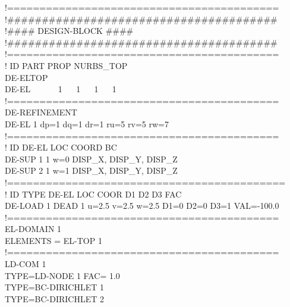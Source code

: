 !==========================================\\
!\#\#\#\#\#\#\#\#\#\#\#\#\#\#\#\#\#\#\#\#\#\#\#\#\#\#\#\#\#\#\#\#\#\#\#\#\#\#\#\\
!\#\#\#\# \hspace*{1.55cm} DESIGN-BLOCK \hspace*{1.55cm} \#\#\#\#\\
!\#\#\#\#\#\#\#\#\#\#\#\#\#\#\#\#\#\#\#\#\#\#\#\#\#\#\#\#\#\#\#\#\#\#\#\#\#\#\#\\
!==========================================\\
!     \hspace*{3cm}         ID  PART  PROP   NURBS\_TOP\\
DE-ELTOP\\
\hspace*{0.5cm} DE-EL    ~~~~~~1 ~~ 1 ~~  1    ~~  1\\
!==========================================\\
DE-REFINEMENT\\
\hspace*{0.5cm} DE-EL    1       dp=1    dq=1  dr=1  ru=5   rv=5  rw=7\\
!==========================================\\
!        ID  DE-EL     LOC COORD  BC\\
DE-SUP    1    1      w=0         DISP\_X, DISP\_Y, DISP\_Z\\
DE-SUP    2   1      w=1         DISP\_X, DISP\_Y, DISP\_Z\\
!===========================================\\
!         ID  TYPE    DE-EL   LOC COOR    D1   D2   D3 FAC\\
DE-LOAD   1  DEAD   1   u=2.5  v=2.5  w=2.5 D1=0 D2=0 D3=1 VAL=-100.0\\
!==========================================\\
EL-DOMAIN 1\\
\hspace*{0.5cm} ELEMENTS = EL-TOP 1\\
!==========================================\\
LD-COM 1\\
\hspace*{0.5cm} TYPE=LD-NODE 1 FAC= 1.0\\
\hspace*{0.5cm} TYPE=BC-DIRICHLET 1\\
\hspace*{0.5cm} TYPE=BC-DIRICHLET 2\\
